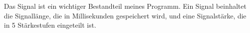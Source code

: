 

Das Signal ist ein wichtiger Bestandteil meines Programm. 
Ein Signal beinhaltet die Signall{\"a}nge, die in Millisekunden gespeichert wird, und eine Signalst{\"a}rke, die in 5 St{\"a}rkestufen eingeteilt ist. 
